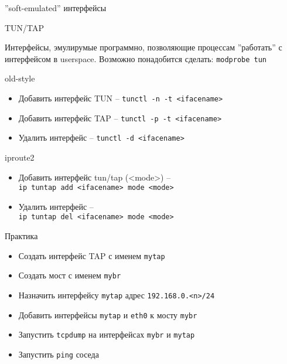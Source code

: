 
\begin{frame}{''soft-emulated'' интерфейсы}
	\begin{block}{TUN/TAP}

        Интерфейсы, эмулирумые программно, позволяющие процессам ''работать'' с интерфейсом в userspace.
		Возможно понадобится сделать: {\tt modprobe tun}

	\end{block}

	\begin{block}{old-style}
		\begin{itemize}
			\item Добавить интерфейс TUN -- {\tt tunctl -n -t <ifacename>}
			\item Добавить интерфейс TAP -- {\tt tunctl -p -t <ifacename>}
			\item Удалить интерфейс -- {\tt tunctl -d <ifacename>}
		\end{itemize}
	\end{block}
	\begin{block}{iproute2}
		\begin{itemize}
			\item Добавить интерфейс tun/tap (<mode>) -- \\ {\tt ip tuntap add <ifacename> mode <mode>}
			\item Удалить интерфейс -- \\ {\tt ip tuntap del <ifacename> mode <mode>}
		\end{itemize}
	\end{block}

\end{frame}

	\begin{block}{Практика}
		\begin{itemize}
			\item Создать интерфейс TAP с именем {\tt mytap}
			\item Создать мост с именем {\tt mybr}
			\item Назначить интерфейсу {\tt mytap} адрес {\tt 192.168.0.<n>/24}
			\item Добавить интерфейсы {\tt mytap} и {\tt eth0} к мосту {\tt mybr}
			\item Запустить {\tt tcpdump} на интерфейсах {\tt mybr} и {\tt mytap}
			\item Запустить {\tt ping} соседа
		\end{itemize}
	\end{block}



